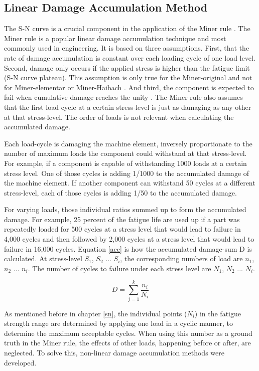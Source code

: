 \subsection{Linear Damage Accumulation Method}\label{LAD}
The S-N curve is a crucial component in the application of the Miner rule \cite{MinerOG, Subramanyan}. The Miner rule is a popular linear damage accumulation technique and most commonly used in engineering. It is based on three assumptions. First, that the rate of damage accumulation is constant over each loading cycle of one load level. Second, damage only occurs if the applied stress is higher than the fatigue limit (S-N curve plateau). This assumption is only true for the Miner-original and not for Miner-elementar or Miner-Haibach \cite{Werner}. And third, the component is expected to fail when cumulative damage reaches the unity \cite{Zuo}.
The Miner rule also assumes that the first load cycle at a certain stress-level is just as damaging as any other at that stress-level. The order of loads is not relevant when calculating the accumulated damage.

Each load-cycle is damaging the machine element, inversely proportionate to the number of maximum loads the component could withstand at that stress-level. For example, if a component is capable of withstanding 1000 loads at a certain stress level. One of those cycles is adding 1/1000 to the accumulated damage of the machine element.
If another component can withstand 50 cycles at a different stress-level, each of those cycles is adding 1/50 to the accumulated damage.

For varying loads, those individual ratios summed up to form the accumulated damage. 
For example, 25 percent of the fatigue life are used up if a part was repeatedly loaded for 500 cycles at a stress level that would lead to failure in 4,000 cycles and then followed by 2,000 cycles at a stress level that would lead to failure in 16,000 cycles.
Equation \ref{acc} is how the accumulated damage-sum D is calculated. At stress-level \(S_1\), \(S_2\) ... \(S_i\), the corresponding numbers of load are \(n_1\), \(n_2\) ... \(n_i\). The number of cycles to failure under each stress level are \(N_1\), \(N_2\) ... \(N_i\).

\begin{equation}\label{acc}
	D = \sum_{j=1}^{k}\frac{n_i}{N_i}
\end{equation}

As mentioned before in chapter \ref{sn}, the individual points (\(N_i\)) in the fatigue strength range are determined by applying one load in a cyclic manner, to determine the maximum acceptable cycles. When using this number as a ground truth in the Miner rule, the effects of other loads, happening before or after, are neglected. To solve this, non-linear damage accumulation methods were developed.

